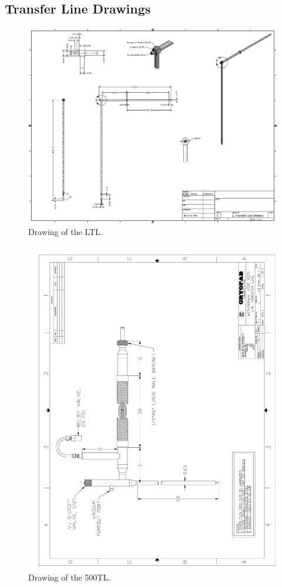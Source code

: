 \begin{appendices}
\chapter{Transfer Line Drawings}
\label{appendix:tl-drawings}

\begin{figure}[!h]
 \centering
 \includegraphics[width=\textwidth]{./img/LTL-drawing.png}
 \caption{Drawing of the LTL.}
 \label{fig:LTL-drawing}
\end{figure}

\begin{figure}[tbp!]
 \centering
 \includegraphics[width=\textwidth]{./img/500TL-drawing.png}
 \caption{Drawing of the 500TL.}
 \label{fig:500TL-drawing}
\end{figure}


\end{appendices}
